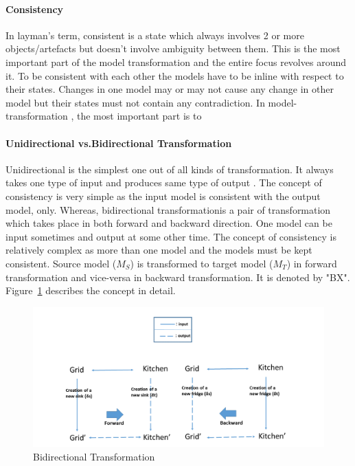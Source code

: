 \paragraph{Consistency} In layman's term, consistent is a state which always involves 2 or more objects/artefacts but doesn't involve ambiguity between them. This is the most important part of the model transformation and the entire focus revolves around it. To be consistent with each other the models have to be inline with respect to their states. Changes in one model may or may not cause any change in other model but their states must not contain any contradiction. In model-transformation , the most important part is to 
\paragraph{Unidirectional vs.Bidirectional Transformation}  Unidirectional is the simplest one out of all kinds of transformation. It always takes one type of input and produces same type of output \cite{wiki-transformation}. The concept of consistency is very simple as the input model is consistent with the output model, only.
\newline Whereas, bidirectional transformationis a pair of transformation which takes place in both forward and backward direction. One model can be input sometimes and output at some other time. The concept of consistency is relatively complex as more than one model and the models must be kept consistent. Source model ($M_{S}$) is transformed to target model ($M_{T}$) in forward transformation and vice-versa in backward transformation. It is denoted by "BX". 
\newline Figure~\ref{fig:BX_Diagram} describes the concept in detail.
\begin{figure}
	\includegraphics[width=1\textwidth]{figures/BX}
	\caption{Bidirectional Transformation}
	\label{fig:BX_Diagram}
\end{figure}


 



